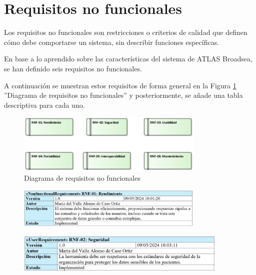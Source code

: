 \section{Requisitos no funcionales} \label{sec:06rnf}

Los requisitos no funcionales son restricciones o criterios de calidad que definen cómo debe comportarse un sistema, sin describir funciones específicas.

En base a lo aprendido sobre las características del sistema de ATLAS Broadsea, se han definido seis requisitos no funcionales.

A continuación se muestran estos requisitos de forma general en la Figura \ref{fig:RNFdiagram} ''Diagrama de requisitos no funcionales'' y posteriormente, se añade una tabla descriptiva para cada uno. 

\begin{figure}[H]
    \centering
    \includegraphics[width=0.80\textwidth]{figures/RNFdiagram.png}
    \caption{Diagrama de requisitos no funcionales}
    \label{fig:RNFdiagram}
\end{figure}

\begin{figure}[H]
    \centering
    \includegraphics[width=0.80\textwidth]{tables/RNF01.png}
    \label{fig:RNF01}
\end{figure}

\begin{figure}[H]
    \centering
    \includegraphics[width=0.90\textwidth]{tables/RNF02.png}
    \label{fig:RNF02}
\end{figure}

